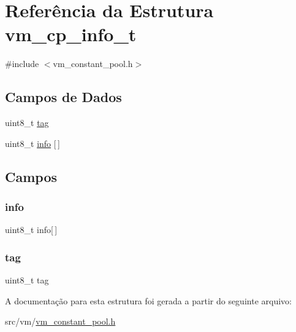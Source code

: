 \hypertarget{structvm__cp__info__t}{}\section{Referência da Estrutura vm\+\_\+cp\+\_\+info\+\_\+t}
\label{structvm__cp__info__t}


{\ttfamily \#include $<$vm\+\_\+constant\+\_\+pool.\+h$>$}

\subsection*{Campos de Dados}
\begin{DoxyCompactItemize}
\item 
uint8\+\_\+t \hyperlink{structvm__cp__info__t_a50ffde9be79dd080d9e8effe3ee52d66}{tag}
\item 
uint8\+\_\+t \hyperlink{structvm__cp__info__t_ae7298a15945258c127fdc64b7556459c}{info} \mbox{[}$\,$\mbox{]}
\end{DoxyCompactItemize}


\subsection{Campos}
\mbox{\label{structvm__cp__info__t_ae7298a15945258c127fdc64b7556459c}} 
\subsubsection{\texorpdfstring{info}{info}}
{\footnotesize\ttfamily uint8\+\_\+t info\mbox{[}$\,$\mbox{]}}

\mbox{\label{structvm__cp__info__t_a50ffde9be79dd080d9e8effe3ee52d66}} 
\subsubsection{\texorpdfstring{tag}{tag}}
{\footnotesize\ttfamily uint8\+\_\+t tag}



A documentação para esta estrutura foi gerada a partir do seguinte arquivo\+:\begin{DoxyCompactItemize}
\item 
src/vm/\hyperlink{vm__constant__pool_8h}{vm\+\_\+constant\+\_\+pool.\+h}\end{DoxyCompactItemize}
